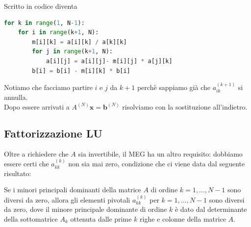 \documentclass[openany]{book}
\begin{document}
Scritto in codice diventa 
\begin{lstlisting}[language=Python]
    for k in range(1, N-1):
    for i in range(k+1, N):
        m[i][k] = a[i][k] / a[k][k]
        for j in range(k+1, N):
            a[i][j] = a[i][j]- m[i][j] * a[j][k]
        b[i] = b[i] - m[i][k] * b[i]
\end{lstlisting}
Notiamo che facciamo partire $i$ e $j$ da $k+1$ perchè sappiamo già che $a_{ik}^{(k+1)}$ si annulla.\\
Dopo essere arrivati a $A^{(N)}\mathbf x = \mathbf b^{(N)}$ risolviamo con la sostituzione all'indietro.

\subsection{Fattorizzazione LU}

Oltre a richiedere che $A$ sia invertibile, il MEG ha un altro requisito: dobbiamo essere certi che $a_{kk}^{(k)}$ non sia mai zero, condizione che ci viene data dal seguente risultato:

\begin{proposition}{}{}
    Se i minori principali dominanti della matrice $A$ di ordine $k = 1,\dots, N-1$ sono diversi da zero, allora gli elementi pivotali $a_{kk}^{(k)}$ per $k = 1,\dots, N-1$ sono diversi da zero, dove il minore principale dominante di ordine $k$ è dato dal determinante della sottomatrice $A_k$ ottenuta dalle prime $k$ righe e colonne della matrice $A$.
\end{proposition}
\end{document}
